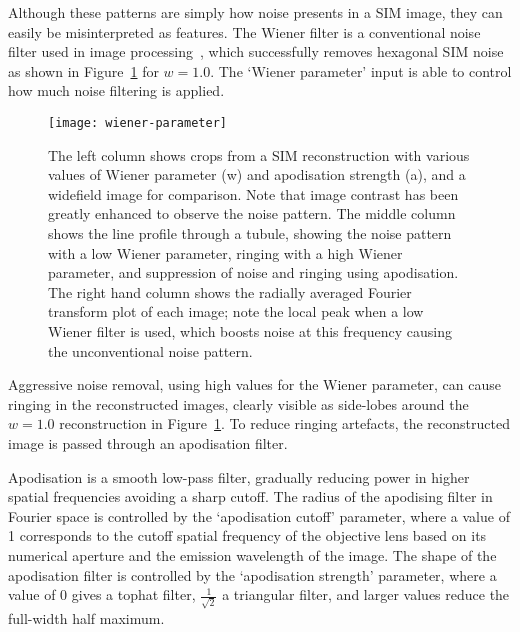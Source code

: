 Although these patterns are simply how noise presents in a SIM image, they can easily be misinterpreted as features. 
The Wiener filter is a conventional noise filter used in image processing~\cite[\textit{ch. 4}]{brown2012introduction}, which successfully removes hexagonal SIM noise as shown in Figure~\ref{fig:wiener-parameter} for $w=1.0$. 
The `Wiener parameter' input is able to control how much noise filtering is applied. 


\begin{figure}[p]
\centering
\texttt{[image: wiener-parameter]}
\caption[LAG SIM: The Wiener parameter and apodisation strength must be chosen to minimise artefacts]{The left column shows crops from a SIM reconstruction with various values of Wiener parameter (w) and apodisation strength (a), and a widefield image for comparison. Note that image contrast has been greatly enhanced to observe the noise pattern. The middle column shows the line profile through a tubule, showing the noise pattern with a low Wiener parameter, ringing with a high Wiener parameter, and suppression of noise and ringing using apodisation. The right hand column shows the radially averaged Fourier transform plot of each image; note the local peak when a low Wiener filter is used, which boosts noise at this frequency causing the unconventional noise pattern.}
\label{fig:wiener-parameter}
\end{figure}

Aggressive noise removal, using high values for the Wiener parameter, can cause ringing in the reconstructed images, clearly visible as side-lobes around the $w=1.0$ reconstruction in Figure~\ref{fig:wiener-parameter}. 
To reduce ringing artefacts, the reconstructed image is passed through an apodisation filter. 

Apodisation is a smooth low-pass filter, gradually reducing power in higher spatial frequencies avoiding a sharp cutoff. 
The radius of the apodising filter in Fourier space is controlled by the `apodisation cutoff' parameter, where a value of 1 corresponds to the cutoff spatial frequency of the objective lens based on its numerical aperture and the emission wavelength of the image. 
The shape of the apodisation filter is controlled by the `apodisation strength' parameter, where a value of 0 gives a tophat filter, $\frac{1}{\sqrt{2}}$ a triangular filter, and larger values reduce the full-width half maximum. %


